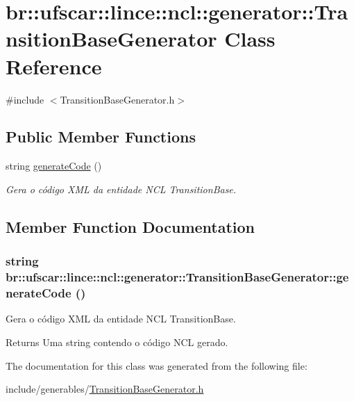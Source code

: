 \hypertarget{classbr_1_1ufscar_1_1lince_1_1ncl_1_1generator_1_1TransitionBaseGenerator}{
\section{br::ufscar::lince::ncl::generator::TransitionBaseGenerator Class Reference}
\label{classbr_1_1ufscar_1_1lince_1_1ncl_1_1generator_1_1TransitionBaseGenerator}
}


{\ttfamily \#include $<$TransitionBaseGenerator.h$>$}

\subsection*{Public Member Functions}
\begin{DoxyCompactItemize}
\item 
string \hyperlink{classbr_1_1ufscar_1_1lince_1_1ncl_1_1generator_1_1TransitionBaseGenerator_aee8a524a80fe0c5d67d4d3294578706b}{generateCode} ()
\begin{DoxyCompactList}\small\item\em Gera o código XML da entidade NCL TransitionBase. \item\end{DoxyCompactList}\end{DoxyCompactItemize}


\subsection{Member Function Documentation}
\hypertarget{classbr_1_1ufscar_1_1lince_1_1ncl_1_1generator_1_1TransitionBaseGenerator_aee8a524a80fe0c5d67d4d3294578706b}{
\subsubsection[{generateCode}]{\setlength{\rightskip}{0pt plus 5cm}string br::ufscar::lince::ncl::generator::TransitionBaseGenerator::generateCode ()}}
\label{classbr_1_1ufscar_1_1lince_1_1ncl_1_1generator_1_1TransitionBaseGenerator_aee8a524a80fe0c5d67d4d3294578706b}


Gera o código XML da entidade NCL TransitionBase. 

\begin{DoxyReturn}{Returns}
Uma string contendo o código NCL gerado. 
\end{DoxyReturn}


The documentation for this class was generated from the following file:\begin{DoxyCompactItemize}
\item 
include/generables/\hyperlink{TransitionBaseGenerator_8h}{TransitionBaseGenerator.h}\end{DoxyCompactItemize}
